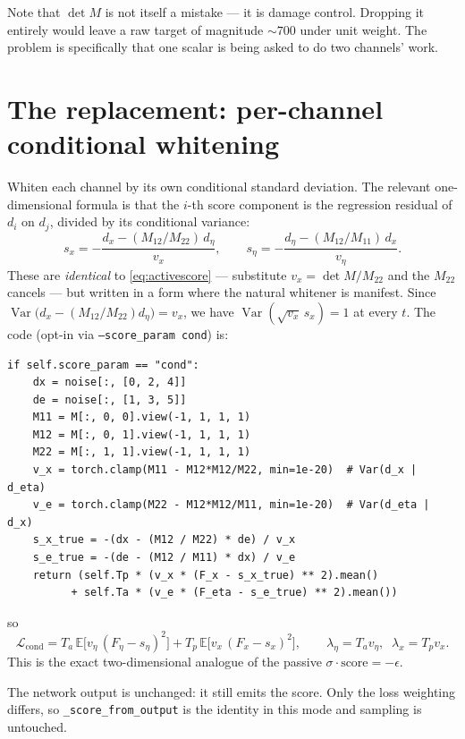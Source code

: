 \documentclass[11pt]{article}
\newcommand{\Tp}{T_p}
\newcommand{\Ta}{T_a}
\DeclareMathOperator{\Var}{Var}
\begin{document}
Note that $\det M$ is not itself a mistake --- it is damage control. Dropping it entirely
would leave a raw target of magnitude $\sim700$ under unit weight. The problem is
specifically that one scalar is being asked to do two channels' work.

\section{The replacement: per-channel conditional whitening}

Whiten each channel by its own conditional standard deviation. The relevant
one-dimensional formula is that the $i$-th score component is the regression residual of
$d_i$ on $d_j$, divided by its conditional variance:
\begin{equation}
s_x = -\frac{d_x - (M_{12}/M_{22})\,d_\eta}{v_x},
\qquad
s_\eta = -\frac{d_\eta - (M_{12}/M_{11})\,d_x}{v_\eta}.
\label{eq:condform}
\end{equation}
These are \emph{identical} to \eqref{eq:activescore} --- substitute $v_x=\det M/M_{22}$ and
the $M_{22}$ cancels --- but written in a form where the natural whitener is manifest.
Since $\Var\!\big(d_x - (M_{12}/M_{22})d_\eta\big)=v_x$, we have
$\Var(\sqrt{v_x}\,s_x)=1$ at every $t$. The code (opt-in via
\texttt{--score\_param cond}) is:

\begin{verbatim}
if self.score_param == "cond":
    dx = noise[:, [0, 2, 4]]
    de = noise[:, [1, 3, 5]]
    M11 = M[:, 0, 0].view(-1, 1, 1, 1)
    M12 = M[:, 0, 1].view(-1, 1, 1, 1)
    M22 = M[:, 1, 1].view(-1, 1, 1, 1)
    v_x = torch.clamp(M11 - M12*M12/M22, min=1e-20)  # Var(d_x | d_eta)
    v_e = torch.clamp(M22 - M12*M12/M11, min=1e-20)  # Var(d_eta | d_x)
    s_x_true = -(dx - (M12 / M22) * de) / v_x
    s_e_true = -(de - (M12 / M11) * dx) / v_e
    return (self.Tp * (v_x * (F_x - s_x_true) ** 2).mean()
          + self.Ta * (v_e * (F_eta - s_e_true) ** 2).mean())
\end{verbatim}

\noindent
so
\begin{equation}
\mathcal{L}_{\text{cond}}
= \Ta\,\mathbb{E}\big[v_\eta\,(F_\eta - s_\eta)^{2}\big]
+ \Tp\,\mathbb{E}\big[v_x\,(F_x - s_x)^{2}\big],
\qquad \lambda_\eta=\Ta v_\eta,\;\; \lambda_x=\Tp v_x .
\label{eq:Lcond}
\end{equation}
This is the exact two-dimensional analogue of the passive $\sigma\cdot\text{score}=-\epsilon$.

The network output is unchanged: it still emits the score. Only the loss weighting differs,
so \texttt{\_score\_from\_output} is the identity in this mode and sampling is untouched.
\end{document}
